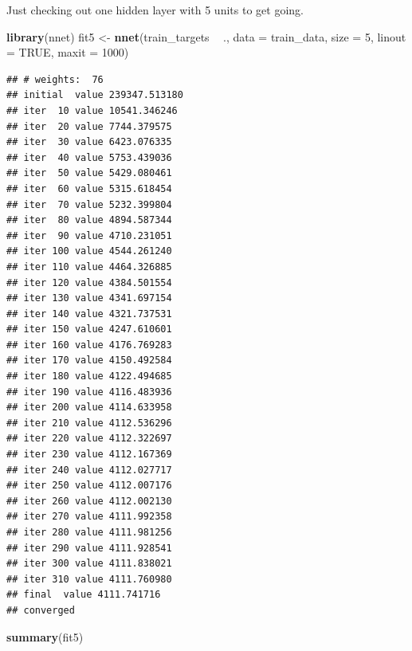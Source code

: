 \documentclass[10pt,ignorenonframetext,]{beamer}
\newenvironment{Shaded}{\begin{snugshade}}{\end{snugshade}}
\newcommand{\DataTypeTok}[1]{\textcolor[rgb]{0.13,0.29,0.53}{#1}}
\newcommand{\DecValTok}[1]{\textcolor[rgb]{0.00,0.00,0.81}{#1}}
\newcommand{\KeywordTok}[1]{\textcolor[rgb]{0.13,0.29,0.53}{\textbf{#1}}}
\newcommand{\NormalTok}[1]{#1}
\newcommand{\OperatorTok}[1]{\textcolor[rgb]{0.81,0.36,0.00}{\textbf{#1}}}
\newcommand{\OtherTok}[1]{\textcolor[rgb]{0.56,0.35,0.01}{#1}}
\newcommand{\StringTok}[1]{\textcolor[rgb]{0.31,0.60,0.02}{#1}}
\begin{document}
\begin{frame}[fragile]

Just checking out one hidden layer with 5 units to get going.

\scriptsize

\begin{Shaded}
\begin{Highlighting}[]
\KeywordTok{library}\NormalTok{(nnet)}
\NormalTok{fit5 <-}\StringTok{ }\KeywordTok{nnet}\NormalTok{(train_targets }\OperatorTok{~}\StringTok{ }\NormalTok{., }\DataTypeTok{data =}\NormalTok{ train_data, }\DataTypeTok{size =} \DecValTok{5}\NormalTok{, }\DataTypeTok{linout =} \OtherTok{TRUE}\NormalTok{, }
    \DataTypeTok{maxit =} \DecValTok{1000}\NormalTok{)}
\end{Highlighting}
\end{Shaded}

\begin{verbatim}
## # weights:  76
## initial  value 239347.513180 
## iter  10 value 10541.346246
## iter  20 value 7744.379575
## iter  30 value 6423.076335
## iter  40 value 5753.439036
## iter  50 value 5429.080461
## iter  60 value 5315.618454
## iter  70 value 5232.399804
## iter  80 value 4894.587344
## iter  90 value 4710.231051
## iter 100 value 4544.261240
## iter 110 value 4464.326885
## iter 120 value 4384.501554
## iter 130 value 4341.697154
## iter 140 value 4321.737531
## iter 150 value 4247.610601
## iter 160 value 4176.769283
## iter 170 value 4150.492584
## iter 180 value 4122.494685
## iter 190 value 4116.483936
## iter 200 value 4114.633958
## iter 210 value 4112.536296
## iter 220 value 4112.322697
## iter 230 value 4112.167369
## iter 240 value 4112.027717
## iter 250 value 4112.007176
## iter 260 value 4112.002130
## iter 270 value 4111.992358
## iter 280 value 4111.981256
## iter 290 value 4111.928541
## iter 300 value 4111.838021
## iter 310 value 4111.760980
## final  value 4111.741716 
## converged
\end{verbatim}

\begin{Shaded}
\begin{Highlighting}[]
\KeywordTok{summary}\NormalTok{(fit5)}
\end{Highlighting}
\end{Shaded}


\end{frame}
\end{document}
